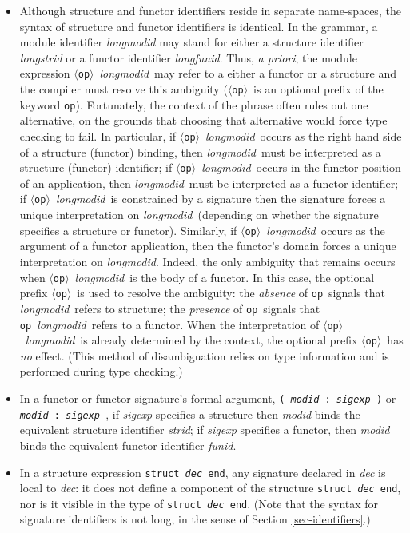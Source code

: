 \documentclass[fleqn,a4paper]{article}
\newcommand{\la}{$\langle$}
\newcommand{\ra}{$\rangle$}
\newcommand{\opop}{\la{\tt op}\ra}
\newcommand{\op}{{\tt op}}
\newcommand{\longmodid}{{\it longmodid}}
\begin{document}
\begin{itemize}

 \item  Although structure and functor identifiers reside in separate name-spaces,
 the syntax of structure and functor identifiers is identical.
 In the grammar, a module identifier {\it longmodid} may stand for either a 
 structure identifier {\it longstrid} or a functor identifier {\it longfunid}.
 Thus, {\sl a priori}, the module expression \opop\ \longmodid\
 may refer to a either a functor or a structure and the compiler
 must resolve this ambiguity (\opop\ is an optional prefix of the keyword \op).
 Fortunately,
 the context of the phrase often rules out one
 alternative, on the grounds that choosing that alternative 
 would force type checking to fail. In particular,
 if \opop\ \longmodid\ occurs as the right hand side of a structure
 (functor) binding, then \longmodid\ must be interpreted as a
 structure (functor) identifier; if
 \opop\ \longmodid\ occurs in the functor position of an application, then
 \longmodid\ must be interpreted as a functor identifier; if
 \opop\ \longmodid\ is constrained by a signature
 then the signature 
 forces a unique interpretation 
 on \longmodid\ (depending on whether the signature specifies a structure or functor).
 Similarly, if \opop\ \longmodid\ occurs as the argument of a functor application,
 then the functor's domain forces a unique interpretation 
 on \longmodid.
 Indeed, the only ambiguity that remains occurs when \opop\ \longmodid\ is the body of a functor. In this case, the optional prefix \opop\ is used to resolve
 the ambiguity:  the {\sl absence} of \op\ signals
 that \longmodid\ refers to structure; the {\sl presence} of \op\ signals that
 \op~\longmodid\ refers to a functor. 
 When the interpretation of \opop\ \longmodid\ is already
 determined by the context, the optional prefix \opop\ has {\sl no} effect.
 (This method of disambiguation relies on type information and is performed during
 type checking.)

 \item In a functor or functor signature's formal argument, 
{\tt ( {\it modid\/} :\ {\it sigexp} )} or 
{\tt {\it modid\/} :\ {\it sigexp} }, 
if {\it sigexp}
specifies a structure then {\it modid} binds the equivalent
structure identifier {\it strid};
if  {\it sigexp} specifies a functor, then {\it modid}
binds the equivalent functor identifier {\it funid}.



\item In a structure expression {\tt struct {\it dec\/} end}, any
signature declared in {\it dec\/} is local to {\it dec\/}: it does not
define a component of the structure {\tt struct {\it dec\/} end}, nor
is it visible in the type of {\tt struct {\it dec\/} end}.
(Note that the syntax for signature identifiers is not long, in
the sense of Section \ref{sec-identifiers}.)


\end{itemize}
\end{document}
